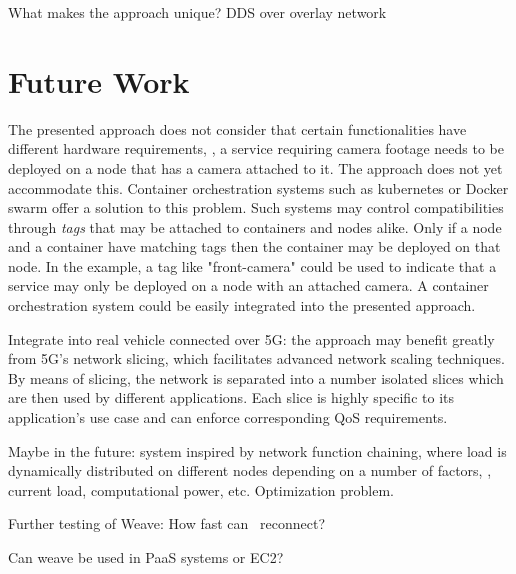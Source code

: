 What makes the approach unique? DDS over overlay network


\section{Future Work}

The presented approach does not consider that certain functionalities have different hardware requirements, \ie , a service requiring camera footage needs to be deployed on a node that has a camera attached to it. The approach does not yet accommodate this. Container orchestration systems such as kubernetes or Docker swarm offer a solution to this problem. Such systems may control compatibilities through \emph{tags} that may be attached to containers and nodes alike. Only if a node and a container have matching tags then the container may be deployed on that node. In the example, a tag like "front-camera" could be used to indicate that a service may only be deployed on a node with an attached camera. A container orchestration system could be easily integrated into the presented approach. 

Integrate into real vehicle connected over 5G: the approach may benefit greatly from 5G's network slicing, which facilitates advanced network scaling techniques. By means of slicing, the network is separated into a number isolated slices which are then used by different applications. Each slice is highly specific to its application's use case and can enforce corresponding QoS requirements.

Maybe in the future: system inspired by network function chaining, where load is dynamically distributed on different nodes depending on a number of factors, \eg , current load, computational power, etc. Optimization problem.



Further testing of Weave: How fast can \wnet\ reconnect?

Can weave be used in PaaS systems or EC2?
